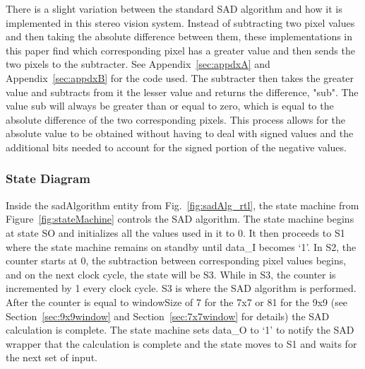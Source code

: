 There is a slight variation between the standard SAD algorithm and how it is implemented in this stereo vision system. Instead of subtracting two pixel values and then taking the absolute difference between them, these implementations in this paper find which corresponding pixel has a greater value and then sends the two pixels to the subtracter. See Appendix~\ref{sec:appdxA} and Appendix~\ref{sec:appdxB} for the code used. The subtracter then takes the greater value and subtracts from it the lesser value and returns the difference, "sub". The value sub will always be greater than or equal to zero, which is equal to the absolute difference of the two corresponding pixels. This process allows for the absolute value to be obtained without having to deal with signed values and the additional bits needed to account for the signed portion of the negative values. 


\subsubsection{State Diagram}

Inside the sadAlgorithm entity from Fig.~\ref{fig:sadAlg_rtl}, the state machine from Figure~\ref{fig:stateMachine} controls the SAD algorithm. The state machine begins at state SO and initializes all the values used in it to 0. It then proceeds to S1 where the state machine remains on standby until data\_I becomes `1'. In S2, the counter starts at 0, the subtraction between corresponding pixel values begins, and on the next clock cycle, the state will be S3. While in S3, the counter is incremented by 1 every clock cycle. S3 is where the SAD algorithm is performed. After the counter is equal to windowSize of 7 for the 7x7 or 81 for the 9x9 (see Section~\ref{sec:9x9window} and Section~\ref{sec:7x7window} for details) the SAD calculation is complete. The state machine sets data\_O to `1' to notify the SAD wrapper that the calculation is complete and the state moves to S1 and waits for the next set of input.

